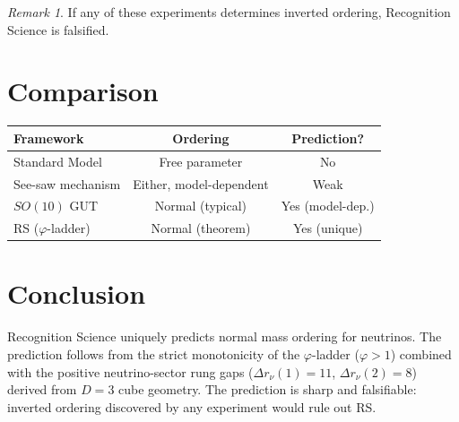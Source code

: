 \documentclass[12pt,a4paper]{article}
\theoremstyle{definition}
\theoremstyle{remark}
\newtheorem{remark}[theorem]{Remark}
\begin{document}
\begin{remark}
If any of these experiments determines inverted ordering,
Recognition Science is falsified.
\end{remark}

\section{Comparison}
\label{sec:comparison}

\begin{center}
\renewcommand{\arraystretch}{1.3}
\begin{tabular}{lcc}
\hline
\textbf{Framework} & \textbf{Ordering} &
\textbf{Prediction?} \\
\hline
Standard Model & Free parameter & No \\
See-saw mechanism & Either, model-dependent & Weak \\
$SO(10)$ GUT & Normal (typical) & Yes (model-dep.) \\
RS ($\varphi$-ladder) & Normal (theorem) & Yes (unique) \\
\hline
\end{tabular}
\end{center}

\section{Conclusion}
\label{sec:conclusion}

Recognition Science uniquely predicts normal mass ordering for
neutrinos.  The prediction follows from the strict monotonicity
of the $\varphi$-ladder ($\varphi > 1$) combined with the
positive neutrino-sector rung gaps
($\Delta r_\nu(1) = 11$, $\Delta r_\nu(2) = 8$)
derived from $D = 3$ cube geometry.  The prediction is sharp
and falsifiable: inverted ordering discovered by any experiment
would rule out RS.
\end{document}
